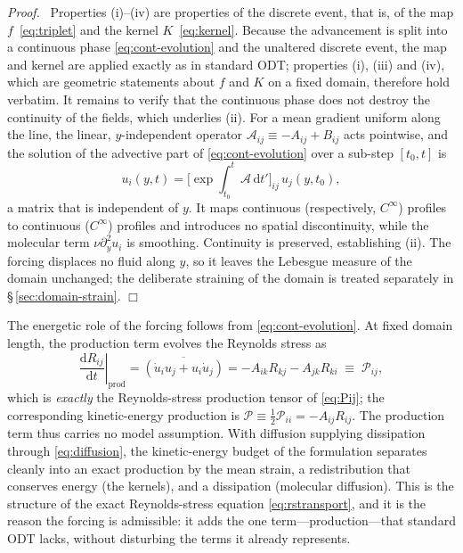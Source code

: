\documentclass[lineno]{JFM-FLM_Au}
\newenvironment{proof}
  {\par\noindent\textit{Proof.}\ }
  {\hfill$\Box$\par}
\newcounter{assumption}
\begin{document}
\begin{proof}
Properties (i)--(iv) are properties of the discrete event, that is, of the
map $f$~\eqref{eq:triplet} and the kernel $K$~\eqref{eq:kernel}. Because the
advancement is split into a continuous phase \eqref{eq:cont-evolution} and
the unaltered discrete event, the map and kernel are applied exactly as in
standard ODT; properties (i), (iii) and (iv), which are geometric
statements about $f$ and $K$ on a fixed domain, therefore hold verbatim.
It remains to verify that the continuous phase does not destroy the
continuity of the fields, which underlies (ii). For a mean gradient uniform
along the line, the linear, $y$-independent operator
$\mathcal{A}_{ij}\equiv -A_{ij}+B_{ij}$ acts pointwise, and the
solution of the advective part of \eqref{eq:cont-evolution} over a
sub-step $[t_0,t]$ is
\begin{equation}
  u_i(y,t)=\big[\exp\!\textstyle\int_{t_0}^{t}\mathcal{A}\,\mathrm{d}t'\big]_{ij}\,
           u_j(y,t_0),
  \label{eq:matrixexp}
\end{equation}
a matrix that is independent of $y$. It maps continuous (respectively,
$C^\infty$) profiles to continuous ($C^\infty$) profiles and introduces no
spatial discontinuity, while the molecular term $\nu\partial_y^2 u_i$ is
smoothing. Continuity is preserved, establishing (ii). The forcing
displaces no fluid along $y$, so it leaves the Lebesgue measure of the
domain unchanged; the deliberate straining of the domain is treated
separately in \S\,\ref{sec:domain-strain}.
\end{proof}

The energetic role of the forcing follows from \eqref{eq:cont-evolution}.
At fixed domain length, the production term evolves the Reynolds stress as
\begin{equation}
  \left.\frac{\mathrm{d}R_{ij}}{\mathrm{d}t}\right|_{\text{prod}}
  = \overline{(\dot u_i u_j + u_i \dot u_j)}
  = -A_{ik}R_{kj}-A_{jk}R_{ki}
  \;\equiv\; \mathcal{P}_{ij},
  \label{eq:production-rate}
\end{equation}
which is \emph{exactly} the Reynolds-stress production tensor of
\eqref{eq:Pij}; the corresponding kinetic-energy production is
$\mathcal{P}\equiv\tfrac12\mathcal{P}_{ii}=-A_{ij}R_{ij}$. The production
term thus carries no model assumption. With diffusion supplying
dissipation through \eqref{eq:diffusion}, the kinetic-energy budget of the
formulation separates cleanly into an exact production by the mean strain,
a redistribution that conserves energy (the kernels), and a dissipation
(molecular diffusion). This is the structure of the exact Reynolds-stress
equation \eqref{eq:rstransport}, and it is the reason the forcing is
admissible: it adds the one term---production---that standard ODT lacks,
without disturbing the terms it already represents.
\end{document}
